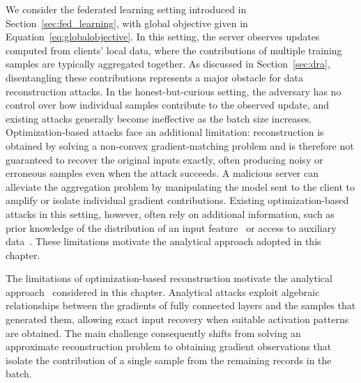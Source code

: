 We consider the federated learning setting introduced in Section~\ref{sec:fed_learning}, with global objective given in Equation~\ref{eq:globalobjective}. In this setting, the server observes updates computed from clients' local data, where the contributions of multiple training samples are typically aggregated together. As discussed in Section~\ref{sec:dra}, disentangling these contributions represents a major obstacle for data reconstruction attacks. In the honest-but-curious setting, the adversary has no control over how individual samples contribute to the observed update, and existing attacks generally become ineffective as the batch size increases. Optimization-based attacks face an additional limitation: reconstruction is obtained by solving a non-convex gradient-matching problem and is therefore not guaranteed to recover the original inputs exactly, often producing noisy or erroneous samples even when the attack succeeds. A malicious server can alleviate the aggregation problem by manipulating the model sent to the client to amplify or isolate individual gradient contributions. Existing optimization-based attacks in this setting, however, often rely on additional information, such as prior knowledge of the distribution of an input feature~\cite{wenFishingUserData2022a} or access to auxiliary data~\cite{garovHidingPlainSight2024}. These limitations motivate the analytical approach adopted in this chapter.

The limitations of optimization-based reconstruction motivate the analytical approach~\cite{phong_gia,fowlRobbingFedDirectly2021} considered in this chapter. Analytical attacks exploit algebraic relationships between the gradients of fully connected layers and the samples that generated them, allowing exact input recovery when suitable activation patterns are obtained. The main challenge consequently shifts from solving an approximate reconstruction problem to obtaining gradient observations that isolate the contribution of a single sample from the remaining records in the batch.


